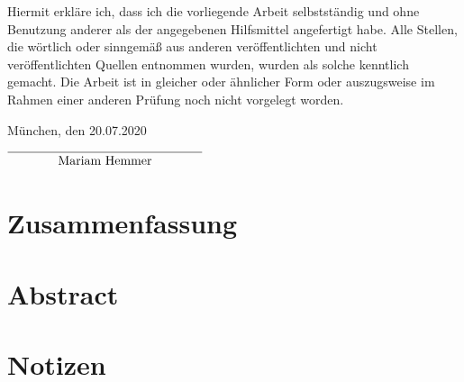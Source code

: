 \documentclass[11pt,a4paper,headsepline,twoside,toc=bibliography]{scrreprt}
\begin{document}
Hiermit erkläre ich, dass ich die vorliegende Arbeit selbstständig und ohne Benutzung anderer als der angegebenen Hilfsmittel angefertigt habe. Alle Stellen, die wörtlich oder sinngemäß aus anderen veröffentlichten und nicht veröffentlichten Quellen entnommen wurden, wurden als solche kenntlich gemacht. Die Arbeit ist in gleicher oder ähnlicher Form oder auszugsweise im Rahmen einer anderen Prüfung noch nicht vorgelegt worden.

\vphantom{M}

\noindent München, den 20.07.2020

\vphantom{M}

\vphantom{M}

\begin{flushright}
$\overline{~~~~~~~~~~~~\mbox{\strut Mariam Hemmer}~~~~~~~~~~~~}$
\end{flushright}


\chapter*{Zusammenfassung}

\chapter*{Abstract}


\cleardoublepage


\tableofcontents
\cleardoublepage



\chapter{Notizen}
\label{sec:general_notes}
\end{document}
